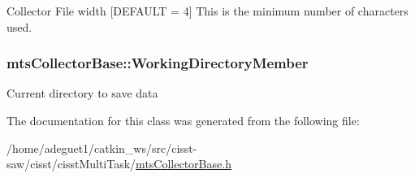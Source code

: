 Collector File width \mbox{[}D\-E\-F\-A\-U\-L\-T = 4\mbox{]} This is the minimum number of characters used. \hypertarget{classmts_collector_base_a1af964c915eb2090cc72a8515dcbea6d}{
\subsubsection[{Working\-Directory\-Member}]{ mts\-Collector\-Base\-::\-Working\-Directory\-Member\hspace{0.3cm}{\ttfamily [protected]}}}\label{classmts_collector_base_a1af964c915eb2090cc72a8515dcbea6d}
Current directory to save data 

The documentation for this class was generated from the following file\-:\begin{DoxyCompactItemize}
\item 
/home/adeguet1/catkin\-\_\-ws/src/cisst-\/saw/cisst/cisst\-Multi\-Task/\hyperlink{mts_collector_base_8h}{mts\-Collector\-Base.\-h}\end{DoxyCompactItemize}
